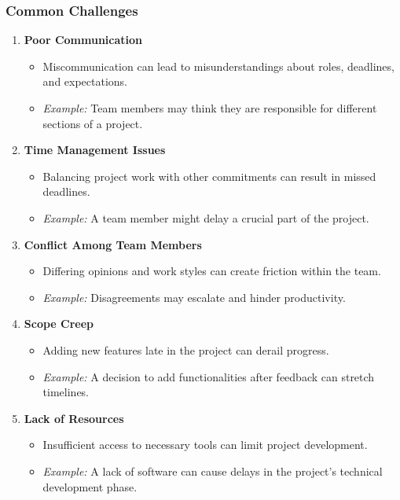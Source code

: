 \documentclass[aspectratio=169]{beamer}
\begin{document}
\begin{frame}[fragile]
    \frametitle{Common Challenges}
    \begin{enumerate}
        \item \textbf{Poor Communication}
        \begin{itemize}
            \item Miscommunication can lead to misunderstandings about roles, deadlines, and expectations.
            \item \textit{Example:} Team members may think they are responsible for different sections of a project.
        \end{itemize}
        
        \item \textbf{Time Management Issues}
        \begin{itemize}
            \item Balancing project work with other commitments can result in missed deadlines.
            \item \textit{Example:} A team member might delay a crucial part of the project.
        \end{itemize}

        \item \textbf{Conflict Among Team Members}
        \begin{itemize}
            \item Differing opinions and work styles can create friction within the team.
            \item \textit{Example:} Disagreements may escalate and hinder productivity.
        \end{itemize}
        
        \item \textbf{Scope Creep}
        \begin{itemize}
            \item Adding new features late in the project can derail progress.
            \item \textit{Example:} A decision to add functionalities after feedback can stretch timelines.
        \end{itemize}

        \item \textbf{Lack of Resources}
        \begin{itemize}
            \item Insufficient access to necessary tools can limit project development.
            \item \textit{Example:} A lack of software can cause delays in the project's technical development phase.
        \end{itemize}
    \end{enumerate}
\end{frame}
\end{document}

